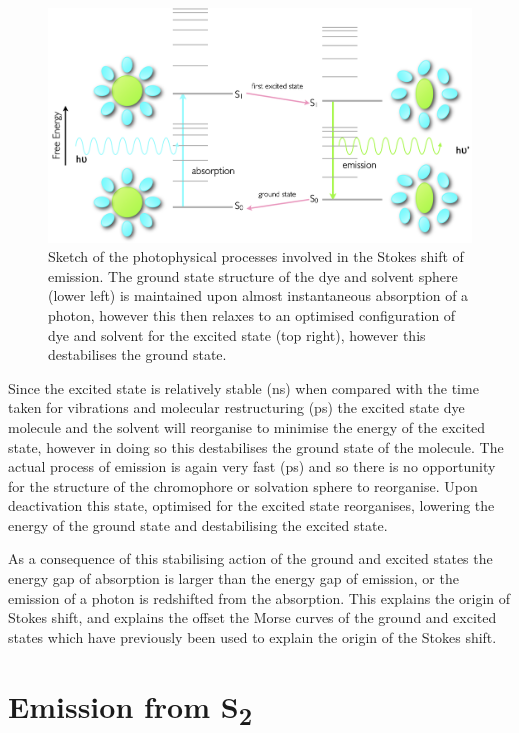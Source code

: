 \documentclass[
]{book}
\begin{document}
\begin{figure}

{\centering \includegraphics[width=0.8\linewidth]{images/stokesenergy} 

}

\caption{Sketch of the photophysical processes involved in the Stokes shift of emission. The ground state structure of the dye and solvent sphere (lower left) is maintained upon almost instantaneous absorption of a photon, however this then relaxes to an optimised configuration of dye and solvent for the excited state (top right), however this destabilises the ground state.}\label{fig:stokesenergy}
\end{figure}

Since the excited state is relatively stable (ns) when compared with the time taken for vibrations and molecular restructuring (ps) the excited state dye molecule and the solvent will reorganise to minimise the energy of the excited state, however in doing so this destabilises the ground state of the molecule. The actual process of emission is again very fast (ps) and so there is no opportunity for the structure of the chromophore or solvation sphere to reorganise. Upon deactivation this state, optimised for the excited state reorganises, lowering the energy of the ground state and destabilising the excited state.

As a consequence of this stabilising action of the ground and excited states the energy gap of absorption is larger than the energy gap of emission, or the emission of a photon is redshifted from the absorption. This explains the origin of Stokes shift, and explains the offset the Morse curves of the ground and excited states which have previously been used to explain the origin of the Stokes shift.

\hypertarget{sec:azuleneS2}{%
\section{\texorpdfstring{Emission from S\textsubscript{2}}{Emission from S2}}\label{sec:azuleneS2}}
\end{document}
